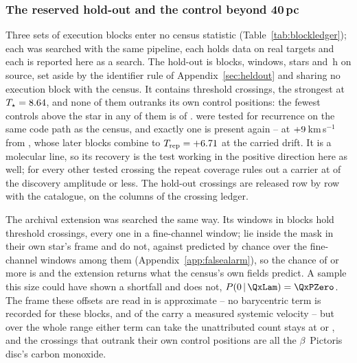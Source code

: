 \subsubsection{The reserved hold-out and the control beyond 40\,pc}
\label{sec:holdoutsearch}

Three sets of execution blocks enter no census statistic
(Table~\ref{tab:blockledger}); each was searched with the same pipeline, each
holds data on real targets and each is reported here as a search. The hold-out is \HoNBlock{} blocks, \HoNWin{} windows, \HoNStar{} stars
and \HoHours\,h on source, set aside by the identifier rule of
Appendix~\ref{sec:heldout} and sharing no execution block
with the census. It contains \HoNCross{} threshold crossings,
the strongest at $T_\star=8.64$, and none of them outranks its own
control positions: the fewest controls above the star in any of them is
\HoNCtrlMin{} of \NCtrl. \HoNTested{} were tested for recurrence on the same
code path as the census, and exactly one is present again -- \HoRecStar{} at
$+9$\,km\,s$^{-1}$ from \HoRecLine, whose \HoRecNRep{} later blocks
combine to $T_{\rm rep}=+6.71$ at the carried drift. It is a molecular
line, so its recovery is the test working in the positive direction here as
well; for every other tested crossing the repeat coverage rules out a carrier
at \HoFracMax{} of the discovery amplitude or less. The hold-out crossings
are released row by row with the catalogue, on the columns of the crossing
ledger.

The archival extension was searched the same way. Its \LdgExtWin{} windows in
\LdgExtEB{} blocks hold \QxObsCross{} threshold crossings, every one in a
fine-channel window; \QxObsAttr{} lie inside the mask in their own star's
frame and \QxObsUnattr{} do not, against \QxLam{} predicted by chance over
the \QxNWinA{} fine-channel windows among them
(Appendix~\ref{app:falsealarm}), so the chance of \QxObsUnattr{} or more is
\QxPGe{} and the extension returns what the census's own fields predict. A
sample this size could have shown a shortfall and does not,
$P(0\,|\,\QxLam)=\QxPZero$. The frame these
offsets are read in is approximate -- no barycentric term is recorded for
these blocks, and \QxNVsysCross{} of the \QxObsCross{} carry a measured
systemic velocity -- but over the whole range either term can take the
unattributed count stays at \QxObsUnattrLo{} or \QxObsUnattrHi, and the
\ExtNStageOne{} crossings that outrank their own control positions are all
the $\beta$~Pictoris disc's carbon monoxide.

